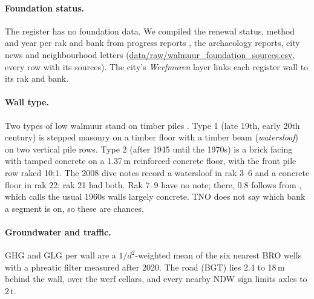 \paragraph{Foundation status.} The register has no foundation data. We
compiled the renewal status, method and year per rak and bank from progress
reports \parencite{antea2019,gu2025up}, the archaeology reports, city news
and neighbourhood letters (\url{data/raw/walmuur_foundation_sources.csv},
every row with its sources). The city's \emph{Werfmuren} layer links each
register wall to its rak and bank.

\paragraph{Wall type.} Two types of low walmuur stand on timber piles
\cite{ibu2010}. Type 1 (late 19th, early 20th century) is stepped masonry on a
timber floor with a timber beam (\emph{watersloof}) on two vertical pile rows.
Type 2 (after 1945 until the 1970s) is a brick facing with tamped concrete on
a 1.37\,m reinforced concrete floor, with the front pile row raked 10:1. The
2008 dive notes \cite{tno2009} record a watersloof in rak 3--6 and a concrete
floor in rak 22; rak 21 had both. Rak 7--9 have no note; there, 0.8 follows
from \textcite{erfgoed156}, which calls the usual 1960s walls largely concrete.
TNO does not say which bank a segment is on, so these are chances.

\paragraph{Groundwater and traffic.} GHG and GLG per wall are a
$1/d^2$-weighted mean of the six nearest BRO wells with a phreatic filter
measured after 2020. The road (BGT) lies 2.4 to 18\,m behind the wall, over the
werf cellars, and every nearby NDW sign limits axles to 2\,t.
